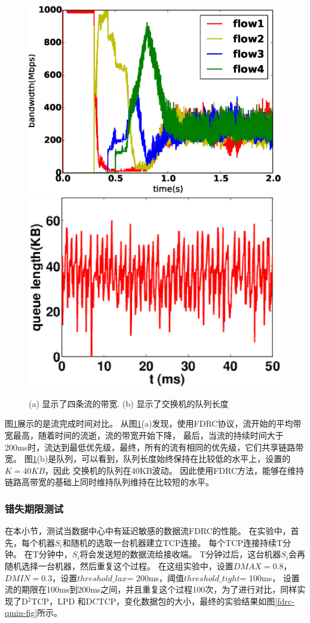 \begin{figure}[h]
\centering
{}
 {\includegraphics[width=0.48\columnwidth]{figures/FDRC/evaluation/Realtest/rate.eps}}
{\includegraphics[width=0.48\columnwidth]{figures/FDRC/evaluation/Realtest/realqueue.eps}}
\caption{(a) 显示了四条流的带宽. (b) 显示了交换机的队列长度}
\label{fdrc-testbed-bandwidt-queue}
\end{figure}
图\ref{fdrc-testbed-bandwidt-queue}展示的是流完成时间对比。
从图\ref{fdrc-testbed-bandwidt-queue}(a)发现，使用FDRC协议，流开始的平均带宽最高，随着时间的流逝，流的带宽开始下降，
最后，当流的持续时间大于200ms时，流达到最低优先级，最终，所有的流有相同的优先级，它们共享链路带宽。
图\ref{fdrc-testbed-bandwidt-queue}(b)是队列，可以看到，队列长度始终保持在比较低的水平上，设置的$K=40KB$，因此
交换机的队列在40KB波动。
因此使用FDRC方法，能够在维持链路高带宽的基础上同时维持队列维持在比较短的水平。





\subsubsection{错失期限测试}
在本小节，测试当数据中心中有延迟敏感的数据流FDRC的性能。
在实验中，首先，每个机器$S_i$和随机的选取一台机器建立TCP连接。
每个TCP连接持续T分钟。
在T分钟中，$S_i$将会发送短的数据流给接收端。
T分钟过后，这台机器$S_i$会再随机选择一台机器，然后重复这个过程。
在这组实验中，设置$DMAX=0.8$，$DMIN=0.3$，设置$threshold\_lax$= 200ms，阈值$threshold\_tight$= 100ms，
设置流的期限在100ms到200ms之间，并且重复这个过程100次，为了进行对比，同样实现了D$^2$TCP，LPD
和DCTCP，变化数据包的大小，最终的实验结果如图\ref{fdrc-qmin-fig}所示。

